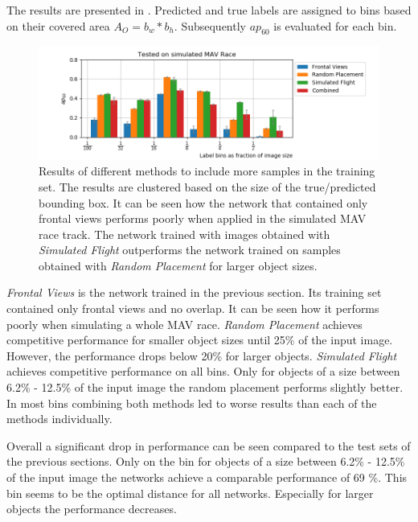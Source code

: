 The results are presented in . Predicted and true labels are assigned to bins based on their covered area $A_O=b_w*b_h$. Subsequently $ap_{60}$ is evaluated for each bin. 
\begin{figure}[hbtp]
	\includegraphics[width=\textwidth]{fig/view_size}
	\caption{Results of different methods to include more samples in the training set. The results are clustered based on the size of the true/predicted bounding box. It can be seen how the network that contained only frontal views performs poorly when applied in the simulated \ac{MAV} race track. The network trained with images obtained with \textit{Simulated Flight} outperforms the network trained on samples obtained with \textit{Random Placement} for larger object sizes.}
	\label{fig:view_size}
\end{figure}

\textit{Frontal Views} is the network trained in the previous section. Its training set contained only frontal views and no overlap. It can be seen how it performs poorly when simulating a whole \ac{MAV} race. \textit{Random Placement} achieves competitive performance for smaller object sizes until 25\% of the input image. However, the performance drops below 20\% for larger objects. \textit{Simulated Flight} achieves competitive performance on all bins. Only for objects of a size between 6.2\% - 12.5\% of the input image the random placement performs slightly better. In most bins combining both methods led to worse results than each of the methods individually.

Overall a significant drop in performance can be seen compared to the test sets of the previous sections. Only on the bin for objects of a size between 6.2\% - 12.5\% of the input image the networks achieve a comparable performance of 69 \%. This bin seems to be the optimal distance for all networks. Especially for larger objects the performance decreases.

